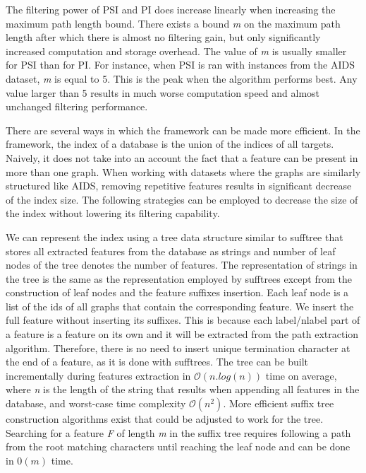 \documentclass{l4proj}
\begin{document}
The filtering power of PSI and PI does increase linearly when increasing the maximum path length bound. There exists a bound \emph{m} on the maximum path length after which there is almost no filtering gain, but only significantly increased computation and storage overhead. The value of \emph{m} is usually smaller for PSI than for PI. For instance, when PSI is ran with instances from the AIDS dataset, \emph{m} is equal to 5. This is the peak when the algorithm performs best. Any value larger than 5 results in much worse computation speed and almost unchanged filtering performance.

There are several ways in which the framework can be made more efficient. In the framework, the index of a database is the union of the indices of all targets. Naively, it does not take into an account the fact that a feature can be present in more than one graph. When working with datasets where the graphs are similarly structured like AIDS, removing repetitive features results in significant decrease of the index size. The following strategies can be employed to decrease the size of the index without lowering its filtering capability.

We can represent the index using a \gls{tree} data structure similar to \gls{sufftree} \cite{weiner:1973} that stores all extracted features from the database as strings and number of leaf nodes of the tree denotes the number of features. The representation of strings in the tree is the same as the representation employed by \glspl{sufftree} except from the construction of leaf nodes and the feature suffixes insertion. Each leaf node is a list of the ids of all graphs that contain the corresponding feature. We insert the full feature without inserting its suffixes. This is because each label/nlabel part of a feature is a feature on its own and it will be extracted from the path extraction algorithm. Therefore, there is no need to insert unique termination character at the end of a feature, as it is done with \glspl{sufftree}. The tree can be built incrementally during features extraction in $\mathcal{O}(n.log(n))$ time on average, where \emph{n} is the length of the string that results when appending all features in the database, and worst-case time complexity $\mathcal{O}(n^{2})$. More efficient suffix tree construction algorithms exist \cite{weiner:1973, McCreight:1976, Ukkonen:1995} that could be adjusted to work for the tree. Searching for a feature \emph{F} of length \emph{m} in the suffix tree requires following a path from the root matching characters until reaching the leaf node and can be done in $\mathcal{0}(m)$ time. %
\end{document}
